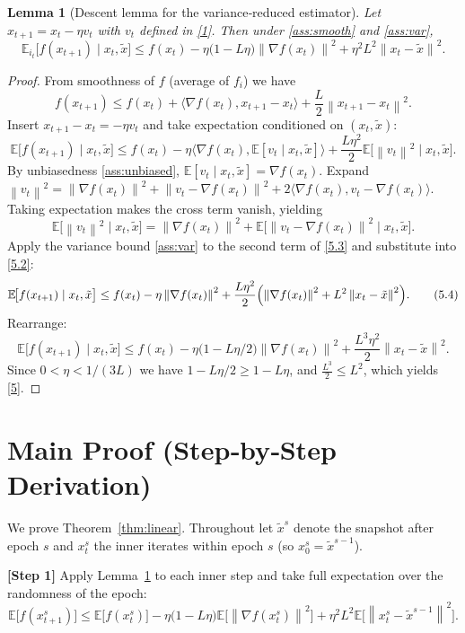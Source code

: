 \documentclass{article}
\newtheorem{lemma}{Lemma}
\newcommand{\E}{\mathbb{E}}
\newcommand{\norm}[1]{\left\|#1\right\|}
\newcommand{\inner}[2]{\langle #1,#2\rangle}
\begin{document}
\begin{lemma}[Descent lemma for the variance‑reduced estimator]\label{lem:descent}
Let $x_{t+1}=x_t-\eta v_t$ with $v_t$ defined in \eqref{1}. Then under \ref{ass:smooth} and \ref{ass:var},
\[
\E_{i_t}\!\bigl[f(x_{t+1})\mid x_t,\tilde x\bigr]
\le f(x_t)-\eta\bigl(1- L\eta\bigr)\norm{\nabla f(x_t)}^{2}
+\eta^{2}L^{2}\norm{x_t-\tilde x}^{2}.
\tag{5}
\]
\end{lemma}
\begin{proof}
From smoothness of $f$ (average of $f_i$) we have
\[
f(x_{t+1})\le f(x_t)+\inner{\nabla f(x_t)}{x_{t+1}-x_t}
+\frac{L}{2}\norm{x_{t+1}-x_t}^{2}.
\tag{5.1}
\]
Insert $x_{t+1}-x_t=-\eta v_t$ and take expectation conditioned on $(x_t,\tilde x)$:
\[
\E\!\bigl[f(x_{t+1})\mid x_t,\tilde x\bigr]
\le f(x_t)-\eta\inner{\nabla f(x_t)}{\E[v_t\mid x_t,\tilde x]}
+\frac{L\eta^{2}}{2}\E\!\bigl[\norm{v_t}^{2}\mid x_t,\tilde x\bigr].
\tag{5.2}
\]
By unbiasedness \ref{ass:unbiased}, $\E[v_t\mid x_t,\tilde x]=\nabla f(x_t)$.  
Expand $\norm{v_t}^{2}=\norm{\nabla f(x_t)}^{2}
+ \norm{v_t-\nabla f(x_t)}^{2}
+2\inner{\nabla f(x_t)}{v_t-\nabla f(x_t)}$.
Taking expectation makes the cross term vanish, yielding
\[
\E\!\bigl[\norm{v_t}^{2}\mid x_t,\tilde x\bigr]
= \norm{\nabla f(x_t)}^{2}
+ \E\!\bigl[\norm{v_t-\nabla f(x_t)}^{2}\mid x_t,\tilde x\bigr].
\tag{5.3}
\]
Apply the variance bound \ref{ass:var} to the second term of \eqref{5.3} and substitute into \eqref{5.2}:
\[
\E\!\bigl[f(x_{t+1})\mid x_t,\tilde x\bigr]
\le f(x_t)-\eta\norm{\nabla f(x_t)}^{2}
+\frac{L\eta^{2}}{2}\Bigl(\norm{\nabla f(x_t)}^{2}+L^{2}\norm{x_t-\tilde x}^{2}\Bigr).
\tag{5.4}
\]
Rearrange:
\[
\E\!\bigl[f(x_{t+1})\mid x_t,\tilde x\bigr]
\le f(x_t)-\eta\bigl(1- L\eta/2\bigr)\norm{\nabla f(x_t)}^{2}
+\frac{L^{3}\eta^{2}}{2}\norm{x_t-\tilde x}^{2}.
\]
Since $0<\eta<1/(3L)$ we have $1- L\eta/2\ge 1- L\eta$, and $\frac{L^{3}}{2}\le L^{2}$, which yields \eqref{5}.
\end{proof}

\section*{Main Proof (Step‑by‑Step Derivation)}
We prove Theorem~\ref{thm:linear}. Throughout let $\tilde x^{s}$ denote the snapshot after epoch $s$ and $x_t^{s}$ the inner iterates within epoch $s$ (so $x_0^{s}=\tilde x^{s-1}$).

\bigskip
\noindent\textbf{[Step 1]} Apply Lemma~\ref{lem:descent} to each inner step and take full expectation over the randomness of the epoch:
\[
\E\!\bigl[f(x_{t+1}^{s})\bigr]
\le \E\!\bigl[f(x_{t}^{s})\bigr]
-\eta\bigl(1- L\eta\bigr)\E\!\bigl[\norm{\nabla f(x_{t}^{s})}^{2}\bigr]
+\eta^{2}L^{2}\E\!\bigl[\norm{x_{t}^{s}-\tilde x^{s-1}}^{2}\bigr].
\tag{6}
\]
\end{document}
